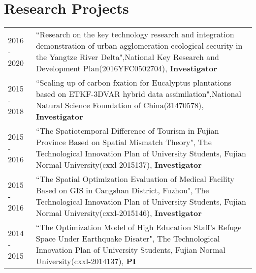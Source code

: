 \section*{Research Projects}

\begin{tabular}{p{} p{}}
2016 - 2020 & ``Research on the key technology research and integration demonstration of urban agglomeration ecological security in the Yangtze River Delta",National Key Research and Development Plan(2016YFC0502704), \textbf{Investigator} \\
2015 - 2018 & ``Scaling up of carbon fxation for Eucalyptus plantations based on ETKF-3DVAR hybrid data assimilation",National Natural Science Foundation of China(31470578), \textbf{Investigator}\\
2015 - 2016 & ``The Spatiotemporal Difference of Tourism in Fujian Province Based on Spatial Mismatch Theory", The Technological Innovation Plan of University Students, Fujian Normal University(cxxl-2015137), \textbf{Investigator}\\
2015 - 2016 & ``The Spatial Optimization Evaluation of Medical Facility Based on GIS in Cangshan District, Fuzhou", The Technological Innovation Plan of University Students, Fujian Normal University(cxxl-2015146), \textbf{Investigator}\\
2014 - 2015 & ``The Optimization Model of High Education Staﬀ’s Refuge Space Under Earthquake Disater", The Technological Innovation Plan of University Students, Fujian Normal University(cxxl-2014137), \textbf{PI}\\
\end{tabular}
